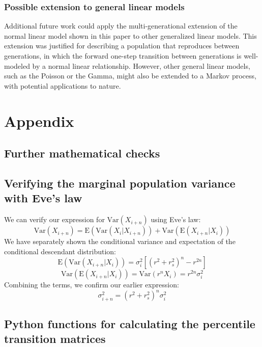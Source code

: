 \documentclass[a4paper,11pt]{article} %
\begin{document}
\subsubsection*{Possible extension to general linear models}

Additional future work could apply the multi-generational extension of the normal linear model shown in this paper to other generalized linear models. This extension was justified for describing a population that reproduces between generations, in which the forward one-step transition between generations is well-modeled by a normal linear relationship. However, other general linear models, such as the Poisson or the Gamma, might also be extended to a Markov process, with potential applications to nature. 

\clearpage







\clearpage



\section{Appendix}

\subsection{Further mathematical checks}
\subsection*{Verifying the marginal population variance with Eve's law}
We can verify our expression for $\mathrm{Var}(X_{i+n})$ using Eve's law:
%
$$\mathrm{Var}(X_{i+n}) = \mathrm{E}(\mathrm{Var}(X_i|X_{i+n})) + \mathrm{Var}(\mathrm{E}(X_{i+n}|X_i))$$
%
We have separately shown the conditional variance and expectation of the conditional descendant distribution:
%
$$\mathrm{E}(\mathrm{Var}(X_{i+n}|X_i)) = \sigma_i^2 [(r^2+r_s^2)^n-r^{2n}]$$
$$\mathrm{Var}(\mathrm{E}(X_{i+n}|X_i)) = \mathrm{Var}(r^nX_i) = r^{2n}\sigma_i^2$$
%
Combining the terms, we confirm our earlier expression:
%
$$\sigma_{i+n}^2 = (r^2+r_s^2)^n  \sigma_i^2$$

\subsection{Python functions for calculating the percentile transition matrices}
\end{document}
